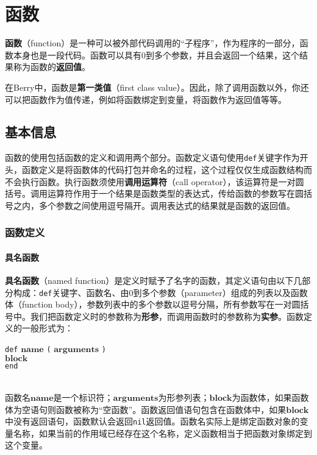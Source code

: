 \chapter{函数}

\textbf{函数}（function）是一种可以被外部代码调用的``子程序''，作为程序的一部分，函数本身也是一段代码。函数可以具有0到多个参数，并且会返回一个结果，这个结果称为函数的\textbf{返回值}。

在Berry中，函数是\textbf{第一类值}（first class value）。因此，除了调用函数以外，你还可以把函数作为值传递，例如将函数绑定到变量，将函数作为返回值等等。

\section{基本信息}

函数的使用包括函数的定义和调用两个部分。函数定义语句使用\texttt{def}关键字作为开头，函数定义是将函数体的代码打包并命名的过程，这个过程仅仅生成函数结构而不会执行函数。执行函数须使用\textbf{调用运算符}（call operator），该运算符是一对圆括号。调用运算符作用于一个结果是函数类型的表达式，传给函数的参数写在圆括号之内，多个参数之间使用逗号隔开。调用表达式的结果就是函数的返回值。

\subsection{函数定义}

\subsubsection{具名函数}

\textbf{具名函数}（named function）是定义时赋予了名字的函数，其定义语句由以下几部分构成：\texttt{def}关键字、函数名、由0到多个参数（parameter）组成的列表以及函数体（function body），参数列表中的多个参数以逗号分隔，所有参数写在一对圆括号中。我们把函数定义时的参数称为\textbf{形参}，而调用函数时的参数称为\textbf{实参}。函数定义的一般形式为：
\begin{algorithm}
    \texttt{def} $\bm{name}$ \texttt{(} $\bm{arguments}$ \texttt{)} \\
        \qquad $\bm{block}$ \\
    \texttt{end}
\end{algorithm}\vspace{-0.6em}\\
函数名$\bm{name}$是一个标识符；$\bm{arguments}$为形参列表；$\bm{block}$为函数体，如果函数体为空语句则函数被称为``空函数''。函数返回值语句包含在函数体中，如果$\bm{block}$中没有返回语句，函数默认会返回\texttt{nil}返回值。函数名实际上是绑定函数对象的变量名称，如果当前的作用域已经存在这个名称，定义函数相当于把函数对象绑定到这个变量。

